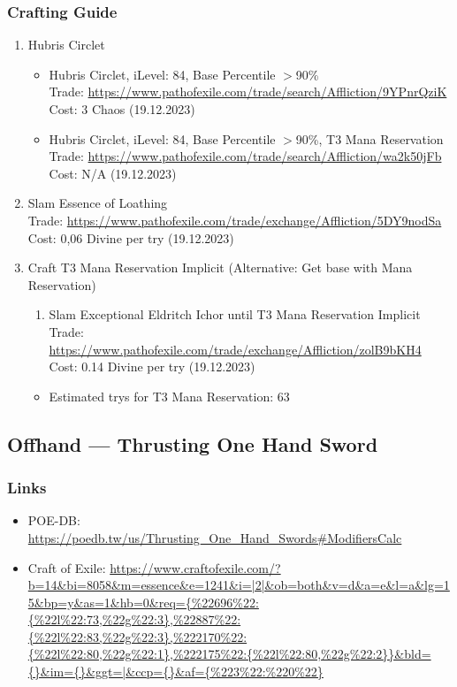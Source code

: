 \subsubsection{Crafting Guide}
\begin{enumerate}
	\item Hubris Circlet
	\begin{itemize}
		\item Hubris Circlet, iLevel: 84, Base Percentile $>$90\%\\
		Trade: \url{https://www.pathofexile.com/trade/search/Affliction/9YPnrQziK}\\
		Cost: 3 Chaos (19.12.2023)
		\item Hubris Circlet, iLevel: 84, Base Percentile $>$90\%, T3 Mana Reservation\\
		Trade: \url{https://www.pathofexile.com/trade/search/Affliction/wa2k50jFb}\\
		Cost: N/A (19.12.2023)
	\end{itemize}
	\item Slam Essence of Loathing\\
		Trade: \url{https://www.pathofexile.com/trade/exchange/Affliction/5DY9nodSa}\\
		Cost: 0,06 Divine per try (19.12.2023)
	\item Craft T3 Mana Reservation Implicit (Alternative: Get base with Mana Reservation)
		\begin{enumerate}
			\item Slam Exceptional Eldritch Ichor until T3 Mana Reservation Implicit\\
				Trade: \url{https://www.pathofexile.com/trade/exchange/Affliction/zolB9bKH4}\\
				Cost: 0.14 Divine per try (19.12.2023)
		\end{enumerate}
		\begin{itemize}
			\item Estimated trys for T3 Mana Reservation: 63
		\end{itemize}
\end{enumerate}

\subsection{Offhand --- Thrusting One Hand Sword}
\subsubsection{Links}
\begin{itemize}
	\item POE-DB:\\
	\url{https://poedb.tw/us/Thrusting_One_Hand_Swords#ModifiersCalc}
	\item Craft of Exile:
	\url{https://www.craftofexile.com/?b=14&bi=8058&m=essence&e=1241&i=|2|&ob=both&v=d&a=e&l=a&lg=15&bp=y&as=1&hb=0&req={%
\end{itemize}


